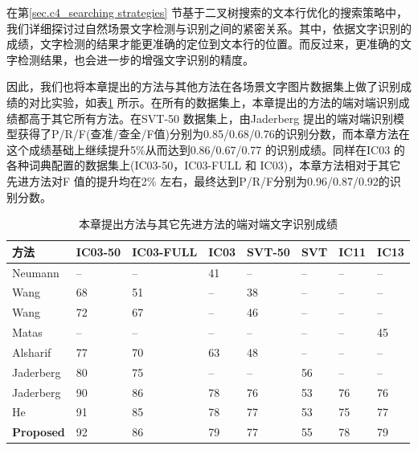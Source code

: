         在第\ref{sec.c4_searching strategies} 节基于二叉树搜索的文本行优化的搜索策略中，我们详细探讨过自然场景文字检测与识别之间的紧密关系。其中，依据文字识别的成绩，文字检测的结果才能更准确的定位到文本行的位置。而反过来，更准确的文字检测结果，也会进一步的增强文字识别的精度。

        因此，我们也将本章提出的方法与其他方法在各场景文字图片数据集上做了识别成绩的对比实验，如表\ref{tab.c4_recognition} 所示。在所有的数据集上，本章提出的方法的端对端识别成绩都高于其它所有方法。在SVT-50 数据集上，由Jaderberg\cite{Jaderberg2016Reading} 提出的端对端识别模型获得了P/R/F(查准/查全/F值)分别为0.85/0.68/0.76的识别分数，而本章方法在这个成绩基础上继续提升5\%从而达到0.86/0.67/0.77 的识别成绩。同样在IC03 的各种词典配置的数据集上(IC03-50，IC03-FULL 和 IC03)，本章方法相对于其它先进方法对F 值的提升均在2\% 左右，最终达到P/R/F分别为0.96/0.87/0.92的识别分数。

        \begin{table}[!h]
        \centering
        \caption{本章提出方法与其它先进方法的端对端文字识别成绩}
        \begin{tabular}{p{} p{} p{} p{} p{} p{} p{} p{} }
        \toprule
        方法 & IC03-50 & IC03-FULL & IC03 & SVT-50 & SVT & IC11 & IC13  \\
        \midrule
        Neumann\cite{Neumann2010A} & -- & -- & 41 & -- & -- & -- & -- \\
        Wang\cite{Wang2012End} & 68 & 51 & -- & 38 & -- & -- & -- \\
        Wang\cite{Wang2012End} & 72 & 67 & -- & 46 & -- & -- & -- \\
        Matas\cite{Matas2014Scene} & -- & -- & -- & -- & -- & -- & 45 \\
        Alsharif\cite{Alsharif2013End} & 77 & 70 & 63 & 48 & -- & -- & -- \\
        Jaderberg\cite{Jaderberg2014Deep} & 80 & 75 & -- & -- & 56 & -- & -- \\
        Jaderberg\cite{Jaderberg2016Reading} & 90 & 86 & 78 & 76 & 53 & 76 & 76 \\
        He\cite{He2017scene} & 91 & 85 & 78 & 77 & 53 & 75 & 77 \\
        \textbf{Proposed} & 92 & 86 & 79 & 77 & 55 & 78 & 79 \\
        \bottomrule
        \end{tabular}
        \label{tab.c4_recognition}
        \end{table}


